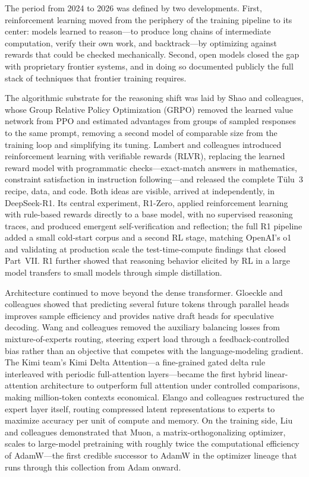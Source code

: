 
The period from 2024 to 2026 was defined by two developments. First, reinforcement learning moved from the periphery of the training pipeline to its center: models learned to reason---to produce long chains of intermediate computation, verify their own work, and backtrack---by optimizing against rewards that could be checked mechanically. Second, open models closed the gap with proprietary frontier systems, and in doing so documented publicly the full stack of techniques that frontier training requires.

The algorithmic substrate for the reasoning shift was laid by Shao and colleagues, whose Group Relative Policy Optimization (GRPO) removed the learned value network from PPO and estimated advantages from groups of sampled responses to the same prompt, removing a second model of comparable size from the training loop and simplifying its tuning. Lambert and colleagues introduced reinforcement learning with verifiable rewards (RLVR), replacing the learned reward model with programmatic checks---exact-match answers in mathematics, constraint satisfaction in instruction following---and released the complete T\"ulu~3 recipe, data, and code. Both ideas are visible, arrived at independently, in DeepSeek-R1. Its central experiment, R1-Zero, applied reinforcement learning with rule-based rewards directly to a base model, with no supervised reasoning traces, and produced emergent self-verification and reflection; the full R1 pipeline added a small cold-start corpus and a second RL stage, matching OpenAI's o1 and validating at production scale the test-time-compute findings that closed Part~VII. R1 further showed that reasoning behavior elicited by RL in a large model transfers to small models through simple distillation.

Architecture continued to move beyond the dense transformer. Gloeckle and colleagues showed that predicting several future tokens through parallel heads improves sample efficiency and provides native draft heads for speculative decoding. Wang and colleagues removed the auxiliary balancing losses from mixture-of-experts routing, steering expert load through a feedback-controlled bias rather than an objective that competes with the language-modeling gradient. The Kimi team's Kimi Delta Attention---a fine-grained gated delta rule interleaved with periodic full-attention layers---became the first hybrid linear-attention architecture to outperform full attention under controlled comparisons, making million-token contexts economical. Elango and colleagues restructured the expert layer itself, routing compressed latent representations to experts to maximize accuracy per unit of compute and memory. On the training side, Liu and colleagues demonstrated that Muon, a matrix-orthogonalizing optimizer, scales to large-model pretraining with roughly twice the computational efficiency of AdamW---the first credible successor to AdamW in the optimizer lineage that runs through this collection from Adam onward.

